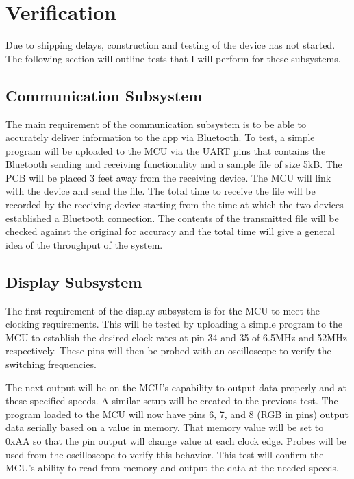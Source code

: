 \documentclass[12pt]{article}
\begin{document}
\section{Verification}

Due to shipping delays, construction and testing of the device has not started. The following section will outline tests that I will perform for these subsystems.

\subsection{Communication Subsystem}

The main requirement of the communication subsystem is to be able to accurately deliver information to the app via Bluetooth. To test, a simple program will be uploaded to the MCU via the UART pins that contains the Bluetooth sending and receiving functionality and a sample file of size 5kB. The PCB will be placed 3 feet away from the receiving device. The MCU will link with the device and send the file. The total time to receive the file will be recorded by the receiving device starting from the time at which the two devices established a Bluetooth connection. The contents of the transmitted file will be checked against the original for accuracy and the total time will give a general idea of the throughput of the system.

\subsection{Display Subsystem}

The first requirement of the display subsystem is for the MCU to meet the clocking requirements. This will be tested by uploading a simple program to the MCU to establish the desired clock rates at pin 34 and 35 of 6.5MHz and 52MHz respectively. These pins will then be probed with an oscilloscope to verify the switching frequencies.

The next output will be on the MCU's capability to output data properly and at these specified speeds. A similar setup will be created to the previous test. The program loaded to the MCU will now have pins 6, 7, and 8 (RGB in pins) output data serially based on a value in memory. That memory value will be set to 0xAA so that the pin output will change value at each clock edge. Probes will be used from the oscilloscope to verify this behavior. This test will confirm the MCU's ability to read from memory and output the data at the needed speeds.
\end{document}
